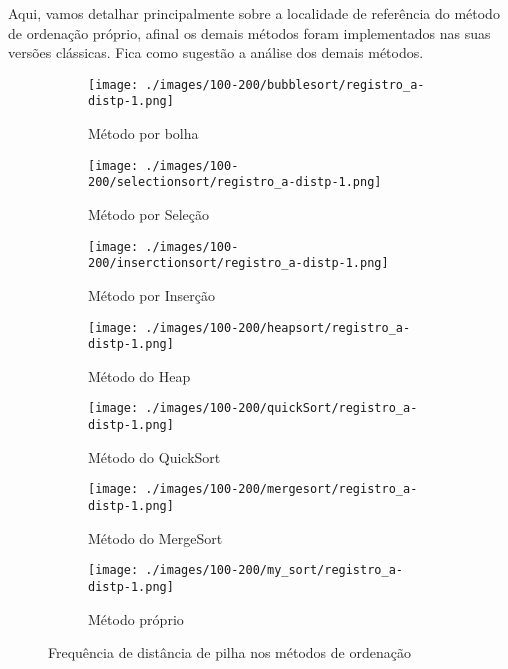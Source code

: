 \documentclass{article}
\begin{document}
Aqui, vamos detalhar principalmente sobre a localidade de referência do método de ordenação próprio, afinal
os demais métodos foram implementados nas suas versões clássicas. Fica como sugestão a análise dos demais métodos. 
\begin{figure}[H]
    \centering
    \hfill
    \begin{subfigure}[c]{0.4\textwidth}
        \centering
        \texttt{[image: ./images/100-200/bubblesort/registro\_a-distp-1.png]}
        \caption{Método por bolha}
        \label{fig:ac05}
    \end{subfigure}
    \hfill
    \begin{subfigure}[c]{0.4\textwidth}
        \centering
        \texttt{[image: ./images/100-200/selectionsort/registro\_a-distp-1.png]}
        \caption{Método por Seleção}
        \label{fig:ac06}
    \end{subfigure}
    \hfill
    \begin{subfigure}[c]{0.4\textwidth}
        \centering
        \texttt{[image: ./images/100-200/inserctionsort/registro\_a-distp-1.png]}
        \caption{Método por Inserção}
        \label{fig:ac07}
    \end{subfigure}
    \hfill
    \begin{subfigure}[c]{0.4\textwidth}
        \centering
        \texttt{[image: ./images/100-200/heapsort/registro\_a-distp-1.png]}
        \caption{Método do Heap}
        \label{fig:ac08}
    \end{subfigure}
    \hfill
    \begin{subfigure}[c]{0.4\textwidth}
        \centering
        \texttt{[image: ./images/100-200/quickSort/registro\_a-distp-1.png]}
        \caption{Método do QuickSort}   
        \label{fig:ac09}
    \end{subfigure}
    \hfill
    \begin{subfigure}[c]{0.4\textwidth}
        \centering
        \texttt{[image: ./images/100-200/mergesort/registro\_a-distp-1.png]}
        \caption{Método do MergeSort}
        \label{fig:ac10}
    \end{subfigure}
    \hfill
    \begin{subfigure}[c]{0.4\textwidth}
        \centering
        \texttt{[image: ./images/100-200/my\_sort/registro\_a-distp-1.png]}
        \caption{Método próprio}
        \label{fig:a11}
    \end{subfigure}
    \hfill
    \caption{Frequência de distância de pilha nos métodos de ordenação}

\end{figure}
\end{document}
